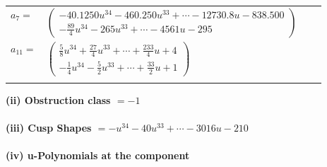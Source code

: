 \documentclass[1p]{elsarticle_modified}
\theoremstyle{definition}
\begin{document}
\begin{tabular}{m{7pt} m{180pt} m{7pt} m{180pt} }
\flushright $a_{7}=$&$\begin{pmatrix}-40.1250 u^{34}-460.250 u^{33}+\cdots-12730.8 u-838.500\\-\frac{89}{4} u^{34}-265 u^{33}+\cdots-4561 u-295\end{pmatrix}$ \\
\flushright $a_{11}=$&$\begin{pmatrix}\frac{5}{8} u^{34}+\frac{27}{4} u^{33}+\cdots+\frac{233}{4} u+4\\-\frac{1}{4} u^{34}-\frac{5}{2} u^{33}+\cdots+\frac{33}{2} u+1\end{pmatrix}$\\&\end{tabular}
\flushleft \textbf{(ii) Obstruction class $= -1$}\\~\\
\flushleft \textbf{(iii) Cusp Shapes $= - u^{34}-40 u^{33}+\cdots-3016 u-210$}\\~\\
\newpage\renewcommand{\arraystretch}{1}
\flushleft \textbf{(iv) u-Polynomials at the component}\newline \\
\end{document}
